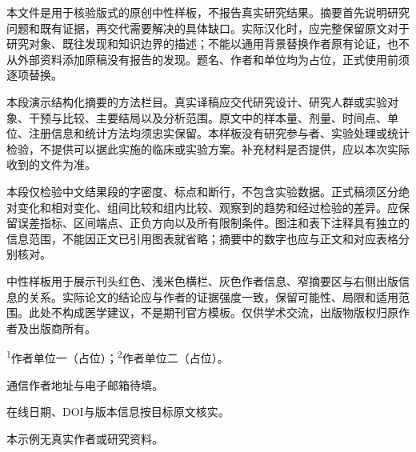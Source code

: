 \documentclass[UTF8,fontset=none,scheme=plain]{ctexart}
\newcommand{\AbstractLabel}[1]{\par\vspace{6bp}{\sffamily\bfseries\fontsize{7.5bp}{9.5bp}\selectfont\textcolor{NEJMRed}{#1}}\par\vspace{2bp}}
\begin{document}
\noindent\hspace*{30.5bp}\begin{minipage}[t]{336bp}\vspace{0pt}\setlength{\parindent}{0pt}\setlength{\parskip}{0pt}
\fontsize{10bp}{13.2bp}\selectfont
\AbstractLabel{背景}
本文件是用于核验版式的原创中性样板，不报告真实研究结果。摘要首先说明研究问题和既有证据，再交代需要解决的具体缺口。实际汉化时，应完整保留原文对于研究对象、既往发现和知识边界的描述；不能以通用背景替换作者原有论证，也不从外部资料添加原稿没有报告的发现。题名、作者和单位均为占位，正式使用前须逐项替换。
\AbstractLabel{方法}
本段演示结构化摘要的方法栏目。真实译稿应交代研究设计、研究人群或实验对象、干预与比较、主要结局以及分析范围。原文中的样本量、剂量、时间点、单位、注册信息和统计方法均须忠实保留。本样板没有研究参与者、实验处理或统计检验，不提供可以据此实施的临床或实验方案。补充材料是否提供，应以本次实际收到的文件为准。
\AbstractLabel{结果}
本段仅检验中文结果段的字密度、标点和断行，不包含实验数据。正式稿须区分绝对变化和相对变化、组间比较和组内比较、观察到的趋势和经过检验的差异。应保留误差指标、区间端点、正负方向以及所有限制条件。图注和表下注释具有独立的信息范围，不能因正文已引用图表就省略；摘要中的数字也应与正文和对应表格分别核对。
\AbstractLabel{结论}
中性样板用于展示刊头红色、浅米色横栏、灰色作者信息、窄摘要区与右侧出版信息的关系。实际论文的结论应与作者的证据强度一致，保留可能性、局限和适用范围。此处不构成医学建议，不是期刊官方模板。仅供学术交流，出版物版权归原作者及出版商所有。
\end{minipage}\hfill\begin{minipage}[t]{127bp}\vspace{0pt}\sffamily\fontsize{7.5bp}{10bp}\selectfont
\textsuperscript{1}作者单位一（占位）；\textsuperscript{2}作者单位二（占位）。\par\medskip *通信作者地址与电子邮箱待填。\par\medskip 在线日期、DOI与版本信息按目标原文核实。\par\medskip 本示例无真实作者或研究资料。
\end{minipage}
\clearpage
\end{document}
